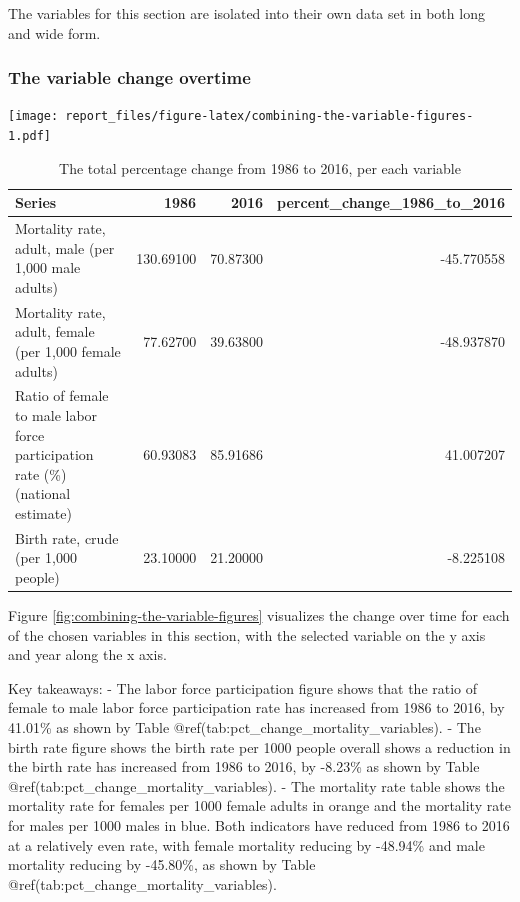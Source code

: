 \documentclass[11pt,a4paper,]{article}
\let\origfigure\figure
\let\endorigfigure\endfigure
\renewenvironment{figure}[1][2] {
    \expandafter\origfigure\expandafter[H]
} {
    \endorigfigure
}%
\begin{document}
The variables for this section are isolated into their own data set in both long and wide form.

\hypertarget{the-variable-change-overtime}{%
\subsubsection{The variable change overtime}\label{the-variable-change-overtime}}

\begin{figure}
\centering
\texttt{[image: report\_files/figure-latex/combining-the-variable-figures-1.pdf]}
\caption{\label{fig:combining-the-variable-figures}Each figure visualises the chosen variables}
\end{figure}

\begin{table}[!h]

\caption{\label{tab:percent-change-over-the-observed-time-period}The total percentage change from 1986 to 2016, per each variable}
\centering
\begin{tabular}[t]{l|r|r|r}
\hline
Series & 1986 & 2016 & percent\_change\_1986\_to\_2016\\
\hline
Mortality rate, adult, male (per 1,000 male adults) & 130.69100 & 70.87300 & -45.770558\\
\hline
Mortality rate, adult, female (per 1,000 female adults) & 77.62700 & 39.63800 & -48.937870\\
\hline
Ratio of female to male labor force participation rate (\%) (national estimate) & 60.93083 & 85.91686 & 41.007207\\
\hline
Birth rate, crude (per 1,000 people) & 23.10000 & 21.20000 & -8.225108\\
\hline
\end{tabular}
\end{table}

Figure \ref{fig:combining-the-variable-figures} visualizes the change over time for each of the chosen variables in this section, with the selected variable on the y axis and year along the x axis.

Key takeaways:
- The labor force participation figure shows that the ratio of female to male labor force participation rate has increased from 1986 to 2016, by 41.01\% as shown by Table @ref(tab:pct\_change\_mortality\_variables).
- The birth rate figure shows the birth rate per 1000 people overall shows a reduction in the birth rate has increased from 1986 to 2016, by -8.23\% as shown by Table @ref(tab:pct\_change\_mortality\_variables).
- The mortality rate table shows the mortality rate for females per 1000 female adults in orange and the mortality rate for males per 1000 males in blue. Both indicators have reduced from 1986 to 2016 at a relatively even rate, with female mortality reducing by -48.94\% and male mortality reducing by -45.80\%, as shown by Table @ref(tab:pct\_change\_mortality\_variables).
\end{document}

